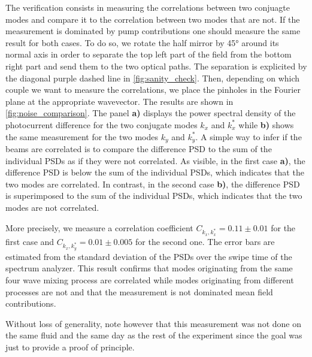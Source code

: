 The verification consists in measuring the correlations between two conjuagte modes and compare it to the correlation between two modes that are not.
If the measurement is dominated by pump contributions one should measure the same result for both cases. To do so, we rotate the half mirror by 45° around its normal axis in order to separate the top left part of the field from the bottom right part and send them to the two optical paths. The separation is explicited
by the diagonal purple dashed line in \autoref{fig:sanity_check}. Then, depending on which couple we want to measure the correlations, we place the pinholes in the Fourier plane at the appropriate wavevector.
The results are shown in \autoref{fig:noise_comparison}. The panel \textbf{a)} displays the power spectral density of the photocurrent difference for the two conjugate modes $k_x$ and $k_x^*$ while \textbf{b)} shows the same measurement for the two modes $k_y$ and $k_y^*$. 
A simple way to infer if the beams are correlated is to compare the difference PSD to the sum of the individual PSDs as if they were not correlated. As visible, in the first case \textbf{a)}, the difference PSD is below the sum of the individual PSDs, which indicates that the two modes are correlated. In contrast, in the second case \textbf{b)}, the difference PSD is superimposed to the sum of the individual PSDs, which indicates that the two modes are not correlated. 

More precisely, we measure a correlation coefficient $C_{k_x,k_x^*}=0.11\pm{0.01}$ for the first case and $C_{k_x,k_y^*}=0.01\pm{0.005}$ for the second one. The error bars are estimated from the standard deviation of the PSDs over the swipe time of the spectrum analyzer.
This result confirms that modes originating from the same four wave mixing process are correlated while modes originating from different processes are not and that the measurement is 
not dominated mean field contributions.

Without loss of generality, note however that this measurement was not done on the same fluid and the same day as the rest of the experiment since the goal was just to provide a proof of principle.  

